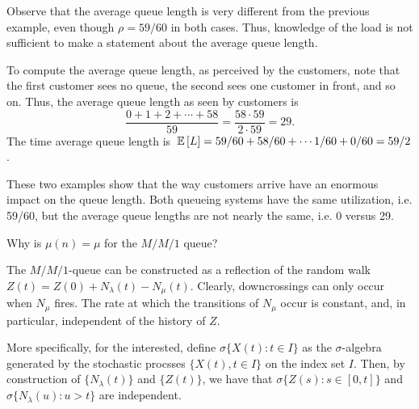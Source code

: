 \begin{question}
\begin{solution}
\begin{enumerate}
  Observe that the average queue length is very different from the
  previous example, even though $\rho = 59/60$ in both cases. Thus,
  knowledge of the load is not sufficient to make a statement about the
  average queue length.

  To compute the average queue length, as perceived by the customers,
  note that the first customer sees no queue, the second sees one
  customer in front, and so on. Thus, the average queue length as seen
  by customers is
  \begin{equation*}
   \frac{0+1+2+\cdots+58}{59}=\frac{58\cdot 59}{2\cdot 59} = 29.
  \end{equation*}
The time average queue length is $\,\mathbb{E}\left[L\right] = 59/60 + 58/60 + \cdots 1/60 + 0/60 = 59/2$. 
\end{enumerate}

These two examples show that the way customers arrive have an enormous
impact on the queue length. Both queueing systems have the same
utilization, i.e. 59/60, but the average queue lengths are not nearly
the same, i.e. 0 versus 29.
  \end{solution}
\end{question}

\begin{question}
  Why is $\mu(n) = \mu$ for the $M/M/1$ queue?  

 \begin{solution}
   The $M/M/1$-queue can be constructed as a reflection of the random
   walk $Z(t) = Z(0) + N_\lambda(t) - N_\mu(t)$. Clearly,
   downcrossings can only occur when $N_\mu$ fires. The rate at which
   the transitions of $N_\mu$ occur is constant, and, in particular,
   independent of the history of $Z$. 

   More specifically, for the interested, define
   $\sigma\{X(t) : t\in I\}$ as the $\sigma$-algebra generated by the
   stochastic procsses $\{X(t), t\in I\}$ on the index set $I$. Then,
   by construction of $\{N_\lambda(t)\}$ and $\{Z(t)\}$, we have that
   $\sigma\{Z(s) : s\in[0,t]\}$  and $\sigma\{N_\lambda(u) : u > t\}$ are independent.
 \end{solution}
\end{question}



